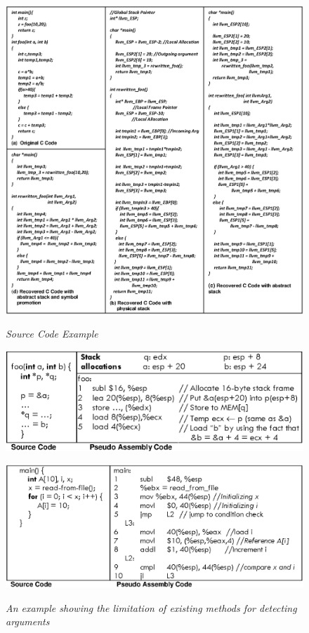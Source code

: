 
\begin{figure}[t]
{
\begin{minipage}{.58\linewidth}
\centering
{
\includegraphics[width=\linewidth]{figures/EPS/c-code-example.eps}
\caption{\textit{Source Code Example}}
\label{fig:origCCode}
}
\end{minipage}
\hfill
\begin{minipage}{.40\linewidth}
\centering
{\includegraphics[width=\linewidth]{figures/EPS/abstract-stack-diff-new.eps}
\caption{\textit{An example showing the limitation of existing methods for detecting arguments}}
\label{fig:abstract-stack-diff}
}
\vspace{1ex}
{
\includegraphics[width=\linewidth]{figures/EPS/new-var-prom-diff.eps}
}
\end{minipage}}
\end{figure}
